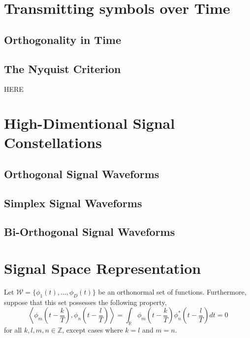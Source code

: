 \newpage

\section{Transmitting symbols over Time}

\subsection{Orthogonality in Time}

\subsection{The Nyquist Criterion}
HERE

\newpage

\section{High-Dimentional Signal Constellations}

\subsection{Orthogonal Signal Waveforms}

\subsection{Simplex Signal Waveforms}

\subsection{Bi-Orthogonal Signal Waveforms}


\section{Signal Space Representation}

Let $\mathcal{W} = \{ \phi_1 (t), \ldots, \phi_D (t) \}$ be an orthonormal set of functions.
Furthermore, suppose that this set possesses the following property,
\begin{equation*}
\left\langle \phi_m \left( t - \frac{k}{T} \right),
\phi_n \left( t - \frac{l}{T} \right) \right\rangle
= \int_{\mathbb{R}} \phi_m \left( t - \frac{k}{T} \right)
\phi_n^* \left( t - \frac{l}{T} \right) dt 
= 0
\end{equation*}
for all $k, l, m, n \in \mathbb{Z}$, except cases where $k = l$ and $m = n$.


